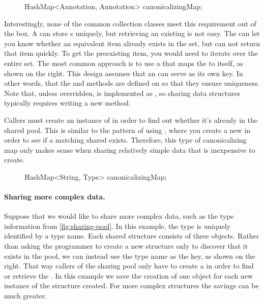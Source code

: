 \begin{figure}
\centering
\begin{framedlisting}
HashMap<Annotation, Annotation> canonicalizingMap;
\end{framedlisting}
\end{figure}

Interestingly, none of the common collection classes meet this requirement
out of the box. A  can store s uniquely, but
retrieving an existing  is not easy. The 
can let you know whether an equivalent item already
exists in the set, but can not return that item quickly. To get the
preexisting item, you would need to iterate over the entire set. The
most common approach is to use a
 that maps the  to itself, as shown on the
right. This design assumes that an  can serve as its own key.
In other words, that the  and  methods are
defined on  so that they ensure uniqueness. Note that, unless overridden,  is
implemented as \code{==}, so sharing data structures typically requires writing
a new  method.  

Callers must create an instance of  in order
to find out whether it's already in the shared pool. This
is similar to the pattern of using , where you create a new
 in order to see if a matching shared  exists. Therefore, this type
of canonicalizing map only makes sense when sharing relatively simple data
that is inexpensive to create.

\begin{figure}
\centering
\begin{framedlisting}
HashMap<String, Type> canonicalizingMap;
\end{framedlisting}
\end{figure}

\paragraph{Sharing more complex data.} Suppose that we would like to
share more complex data, such as the type information from \autoref{fig:sharing-pool}. In this example, the type is
uniquely identified by a  type name. Each shared structure
consists of three objects. Rather than asking the programmer to create a new  structure only to discover
that it exists in the pool, we can instead use the type name as the key, as
shown on the right. That way callers of the sharing pool only have to create a
 in order to find or retrieve the . In this example we save the creation of
one object for each new instance of the structure created.  For more complex
structures the savings can be much greater.

